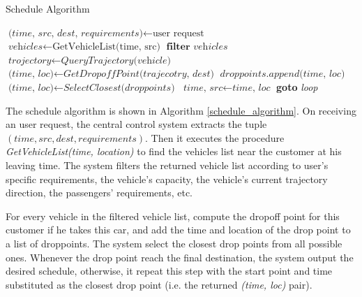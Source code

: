 \documentclass{vldb}
\begin{document}
\begin{algorithm}
  \caption{Schedule Algorithm}
  \label{schedule_algorithm}
  \begin{algorithmic}[1] %
      \State $\textit{(time, src, dest, requirements)} \leftarrow \text{user request}$
      \Label {}
      \State $\textit{vehicles} \leftarrow \text{GetVehicleList(time, src)}$
      \State $\textbf{filter } \textit{vehicles}$
        \State $\textit{trojectory} \leftarrow \textit{QueryTrajectory(vehicle)}$
        \State $\textit{(time, loc)} \leftarrow \textit{GetDropoffPoint(trajecotry, dest)}$
        \State $\textit{droppoints}.append \textit{(time, loc)}$
      \EndFor
      \State $\textit{(time, loc)} \leftarrow \textit{SelectClosest(droppoints)}$
       \Return
      \Else
        \State $\textit{time, src} \leftarrow \textit{time, loc}$
        \State \textbf{goto} \emph{loop}
      \EndIf
    \EndProcedure
  \end{algorithmic}
\end{algorithm}

The schedule algorithm is shown in Algorithm \ref{schedule_algorithm}.
On receiving an user request,
the central control system extracts the tuple $(time, src, dest, requirements)$.
Then it executes the procedure \textit{GetVehicleList(time, location)}
to find the vehicles list near the customer at his leaving time.
The system filters the returned vehicle list according to user's specific requirements,
the vehicle's capacity, the vehicle's current trajectory direction,
the passengers' requirements, etc.

For every vehicle in the filtered vehicle list,
compute the dropoff point for this customer if he takes this car,
and add the time and location of the drop point to a list of droppoints.
The system select the closest drop points from all possible ones.
Whenever the drop point reach the final destination, the system output the desired schedule,
otherwise, it repeat this step with the start point and time substituted as the closest drop point
(i.e. the returned \textit{(time, loc)} pair).
\end{document}
